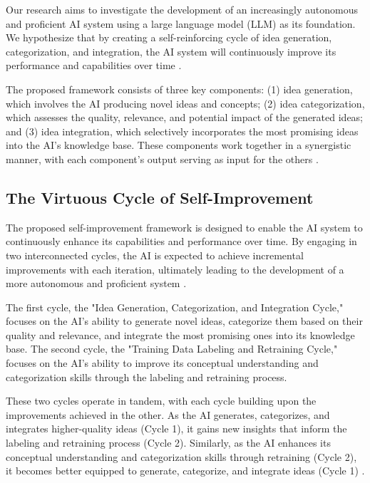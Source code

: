 \documentclass[conference]{article}
\begin{document}
	Our research aims to investigate the development of an increasingly autonomous and proficient AI system using a large language model (LLM) as its foundation. We hypothesize that by creating a self-reinforcing cycle of idea generation, categorization, and integration, the AI system will continuously improve its performance and capabilities over time \cite{silver2021reward, bostrom2017superintelligence}.
	
	The proposed framework consists of three key components: (1) idea generation, which involves the AI producing novel ideas and concepts; (2) idea categorization, which assesses the quality, relevance, and potential impact of the generated ideas; and (3) idea integration, which selectively incorporates the most promising ideas into the AI's knowledge base. These components work together in a synergistic manner, with each component's output serving as input for the others \cite{lake2017building, bengio2013representation}.
	
	\subsection{The Virtuous Cycle of Self-Improvement}
	
	The proposed self-improvement framework is designed to enable the AI system to continuously enhance its capabilities and performance over time. By engaging in two interconnected cycles, the AI is expected to achieve incremental improvements with each iteration, ultimately leading to the development of a more autonomous and proficient system \cite{bostrom2017superintelligence, silver2021reward}.
	
	The first cycle, the "Idea Generation, Categorization, and Integration Cycle," focuses on the AI's ability to generate novel ideas, categorize them based on their quality and relevance, and integrate the most promising ones into its knowledge base. The second cycle, the "Training Data Labeling and Retraining Cycle," focuses on the AI's ability to improve its conceptual understanding and categorization skills through the labeling and retraining process.
	
	These two cycles operate in tandem, with each cycle building upon the improvements achieved in the other. As the AI generates, categorizes, and integrates higher-quality ideas (Cycle 1), it gains new insights that inform the labeling and retraining process (Cycle 2). Similarly, as the AI enhances its conceptual understanding and categorization skills through retraining (Cycle 2), it becomes better equipped to generate, categorize, and integrate ideas (Cycle 1) \cite{bostrom2017superintelligence, russell2019human}.
	
\end{document}
